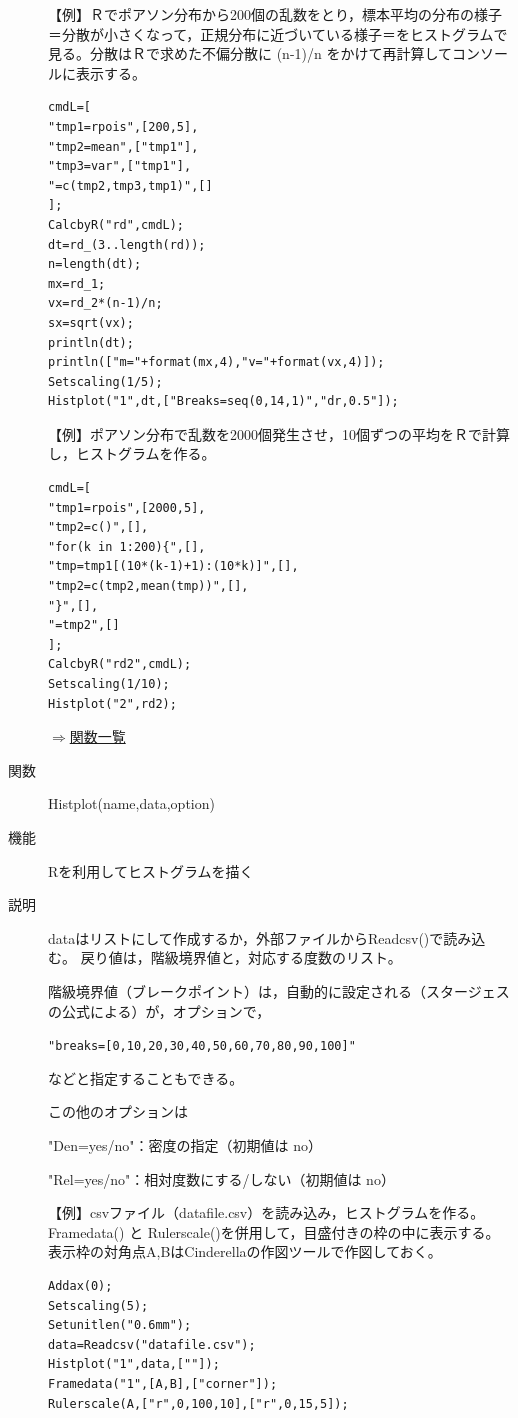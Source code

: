 \documentclass[papersize,a4paper,12pt,uplatex]{jsarticle}
\begin{document}
\begin{description}
\vspace{\baselineskip}
【例】Ｒでポアソン分布から200個の乱数をとり，標本平均の分布の様子＝分散が小さくなって，正規分布に近づいている様子＝をヒストグラムで見る。分散はＲで求めた不偏分散に (n-1)/n をかけて再計算してコンソールに表示する。
\begin{verbatim}
cmdL=[
"tmp1=rpois",[200,5],
"tmp2=mean",["tmp1"],
"tmp3=var",["tmp1"],
"=c(tmp2,tmp3,tmp1)",[]
];
CalcbyR("rd",cmdL);
dt=rd_(3..length(rd));
n=length(dt);
mx=rd_1;
vx=rd_2*(n-1)/n;
sx=sqrt(vx);
println(dt);
println(["m="+format(mx,4),"v="+format(vx,4)]);
Setscaling(1/5);
Histplot("1",dt,["Breaks=seq(0,14,1)","dr,0.5"]);
\end{verbatim}
\vspace{\baselineskip}
\begin{center}  \end{center}
\vspace{\baselineskip}
【例】ポアソン分布で乱数を2000個発生させ，10個ずつの平均をＲで計算し，ヒストグラムを作る。
\begin{verbatim}
cmdL=[
"tmp1=rpois",[2000,5],
"tmp2=c()",[],
"for(k in 1:200){",[],
"tmp=tmp1[(10*(k-1)+1):(10*k)]",[],
"tmp2=c(tmp2,mean(tmp))",[],
"}",[],
"=tmp2",[]
];
CalcbyR("rd2",cmdL);
Setscaling(1/10);
Histplot("2",rd2);
\end{verbatim}

\begin{flushright}\hyperlink{functionlist}{$\Rightarrow$関数一覧}\end{flushright}
\hypertarget{histplot}{}
\item[関数]Histplot(name,data,option)
\item[機能]Rを利用してヒストグラムを描く
\item[説明]dataはリストにして作成するか，外部ファイルからReadcsv()で読み込む。
戻り値は，階級境界値と，対応する度数のリスト。

階級境界値（ブレークポイント）は，自動的に設定される（スタージェスの公式による）が，オプションで，

\verb|"breaks=[0,10,20,30,40,50,60,70,80,90,100]"|

などと指定することもできる。

この他のオプションは

"Den=yes/no"：密度の指定（初期値は no）

"Rel=yes/no"：相対度数にする/しない（初期値は no）

\vspace{\baselineskip}
【例】csvファイル（datafile.csv）を読み込み，ヒストグラムを作る。Framedata() と Rulerscale()を併用して，目盛付きの枠の中に表示する。表示枠の対角点A,BはCinderellaの作図ツールで作図しておく。
\begin{verbatim}
Addax(0);
Setscaling(5);
Setunitlen("0.6mm");
data=Readcsv("datafile.csv");
Histplot("1",data,[""]);
Framedata("1",[A,B],["corner"]);
Rulerscale(A,["r",0,100,10],["r",0,15,5]);
\end{verbatim}
\begin{center}  \end{center}


\end{description}
\end{document}
